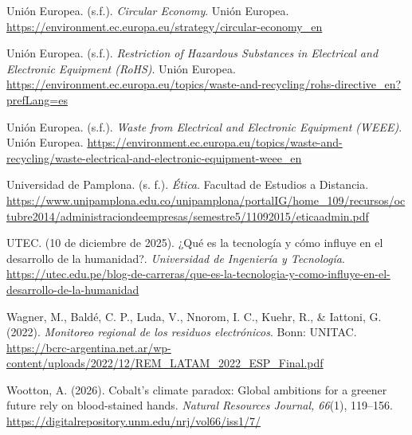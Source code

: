 \documentclass[stu,12pt,a4paper]{apa7}
\begin{document}
\begin{list}{}{
    \setlength{\leftmargin}{1.27cm}
    \setlength{\itemindent}{-1.27cm}  
    \setlength{\parsep}{0pt}       
    \setlength{\itemsep}{0.8em}      
}
\item Unión Europea. (s.f.). \textit{Circular Economy}. Unión Europea. \url{https://environment.ec.europa.eu/strategy/circular-economy_en}

\item Unión Europea. (s.f.). \textit{Restriction of Hazardous Substances in Electrical and Electronic Equipment (RoHS)}. Unión Europea. \url{https://environment.ec.europa.eu/topics/waste-and-recycling/rohs-directive_en?prefLang=es}

\item Unión Europea. (s.f.). \textit{Waste from Electrical and Electronic Equipment (WEEE)}. Unión Europea. \url{https://environment.ec.europa.eu/topics/waste-and-recycling/waste-electrical-and-electronic-equipment-weee_en}

\item Universidad de Pamplona. (s. f.). \textit{Ética}. Facultad de Estudios a Distancia. \url{https://www.unipamplona.edu.co/unipamplona/portalIG/home_109/recursos/octubre2014/administraciondeempresas/semestre5/11092015/eticaadmin.pdf}

\item UTEC. (10 de diciembre de 2025). ¿Qué es la tecnología y cómo influye en el desarrollo de la humanidad?. \textit{Universidad de Ingeniería y Tecnología}. \url{https://utec.edu.pe/blog-de-carreras/que-es-la-tecnologia-y-como-influye-en-el-desarrollo-de-la-humanidad}

\item Wagner, M., Baldé, C. P., Luda, V., Nnorom, I. C., Kuehr, R., \& Iattoni, G. (2022). \textit{Monitoreo regional de los residuos electrónicos}. Bonn: UNITAC. \url{https://bcrc-argentina.net.ar/wp-content/uploads/2022/12/REM_LATAM_2022_ESP_Final.pdf}

\item Wootton, A. (2026). Cobalt's climate paradox: Global ambitions for a greener future rely on blood-stained hands. \textit{Natural Resources Journal, 66}(1), 119–156. \url{https://digitalrepository.unm.edu/nrj/vol66/iss1/7/}


\end{list}
\end{document}
